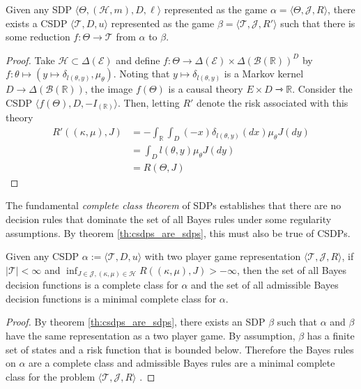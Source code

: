 \begin{theorem}\label{th:csdps_represent_sdps}
Given any SDP $\langle \Theta, (\mathscr{H},m), D, \ell\rangle$ represented as the game $\alpha = \langle \Theta, \mathscr{J},R\rangle$, there exists a CSDP $\langle \mathscr{T},D,u\rangle$ represented as the game $\beta=\langle\mathscr{T},\mathscr{J},R' \rangle$ such that there is some reduction $f:\Theta\to \mathscr{T}$ from $\alpha$ to $\beta$.
\end{theorem} 

\begin{proof}
Take $\mathscr{H}\subset\Delta(\mathcal{E})$ and define $f:\Theta\to \Delta(\mathcal{E})\times \Delta(\mathcal{B}(\mathbb{R}))^D$ by $f:\theta\mapsto (y\mapsto \delta_{l(\theta,y)},\mu_\theta)$. Noting that $y\mapsto \delta_{l(\theta,y)}$ is a Markov kernel $D\to \Delta(\mathcal{B}(\mathbb{R}))$, the image $f(\Theta)$ is a causal theory $E\times D\rightarrowtriangle \mathbb{R}$. Consider the CSDP $\langle f(\Theta),D,-I_{(\mathbb{R})}\rangle$. Then, letting $R'$ denote the risk associated with this theory
\begin{align}
 R'((\kappa,\mu),J) &= -\int_\mathbb{R} \int_D (-x) \delta_{l(\theta,y)}(dx) \mu_\theta J(dy)\\
 					&= \int_D l(\theta,y) \mu_\theta J(dy)\\
 					&= R(\Theta,J)
\end{align}
\end{proof}

The fundamental \emph{complete class theorem} of SDPs establishes that there are no decision rules that dominate the set of all Bayes rules under some regularity assumptions. By theorem \ref{th:csdps_are_sdps}, this must also be true of CSDPs.

\begin{theorem}\label{th:complete_class}
Given any CSDP $\alpha:=\langle \mathscr{T},D,u\rangle$ with two player game representation $\langle \mathscr{T},\mathscr{J},R\rangle$, if $|\mathscr{T}|<\infty$ and $\inf_{J\in\mathscr{J},(\kappa,\mu)\in\mathscr{H}} R((\kappa,\mu),J)>-\infty$, then the set of all Bayes decision functions is a complete class for $\alpha$ and the set of all admissible Bayes decision functions is a minimal complete class for $\alpha$.
\end{theorem}

\begin{proof}
By theorem \ref{th:csdps_are_sdps}, there exists an SDP $\beta$ such that $\alpha$ and $\beta$ have the same representation as a two player game. By assumption, $\beta$ has a finite set of states and a risk function that is bounded below. Therefore the Bayes rules on $\alpha$ are a complete class and admissible Bayes rules are a minimal complete class for the problem $\langle \mathscr{T},\mathscr{J},R\rangle$ \citep{toutenburg_ferguson_1967}.
\end{proof}

